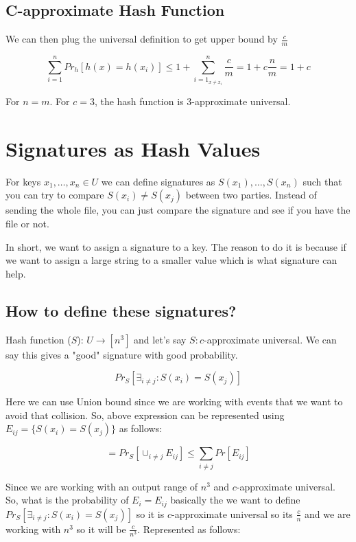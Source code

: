 \documentclass{article}
\begin{document}
\subsection{C-approximate Hash Function}

We can then plug the universal definition to get upper bound by $\frac{c}{m}$

$$
\sum_{i=1}^{n} Pr_{h}[h(x) = h(x_i)] \leq 1 + \sum^{n}_{{i=1}_{x \neq x_i}} \frac{c}{m} = 1 + c \frac{n}{m} = 1 + c
$$

For $n = m$. For $c = 3$, the hash function is $3$-approximate universal.

\section{Signatures as Hash Values}
For keys $x_1, \ldots, x_n \in U$ we can define signatures as $S(x_1), \ldots, S(x_n)$ such that you can try to compare $S(x_i) \neq S(x_j)$ between two parties. Instead of sending the whole file, you can just compare the signature and see if you have the file or not.

In short, we want to assign a signature to a key. The reason to do it is because if we want to assign a large string to a smaller value which is what signature can help.

\subsection{How to define these signatures?}

Hash function ($S$): $U \rightarrow [n^3]$ and let's say $S: c$-approximate universal. We can say this gives a "good" signature with good probability.

$$
Pr_{S}[\exists_{i\neq j}: S(x_i) = S(x_j)]
$$

Here we can use Union bound since we are working with events that we want to avoid that collision. So, above expression can be represented using $E_{ij} = \{S(x_i) = S(x_j)\}$ as follows:

$$
= Pr_{S}[\cup_{i \neq j} E_{ij}] \leq \sum_{i \neq j} Pr[E_{ij}]
$$

Since we are working with an output range of $n^3$ and $c$-approximate universal. So, what is the probability of $E_{i} = E_{ij}$ basically the we want to define $Pr_{S}[\exists_{i\neq j}: S(x_i) = S(x_j)]$ so it is $c$-approximate universal so its $\frac{c}{n}$ and we are working with $n^3$ so it will be $\frac{c}{n^3}$. Represented as follows:
\end{document}
